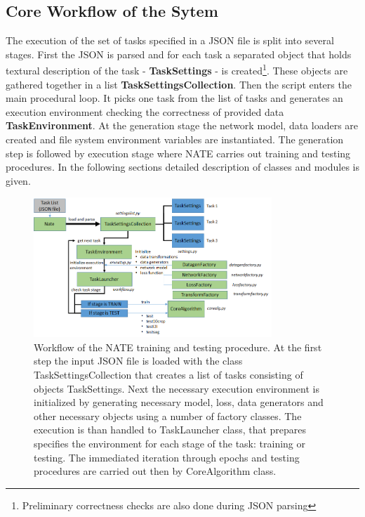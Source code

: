\documentclass[a4paper, 11pt]{article}
\begin{document}
\subsection{Core Workflow of the Sytem}
The execution of the set of tasks specified in a JSON file is split into several stages. First the JSON is parsed and for each task a separated object that holds textural description of the task - \textbf{TaskSettings} - is created\footnote{Preliminary correctness checks are also done during JSON parsing}. 
These objects are gathered together in a list \textbf{TaskSettingsCollection}. Then the script enters the main procedural loop. It picks one task from the list of tasks and generates an execution environment checking the correctness of provided data \textbf{TaskEnvironment}. At the generation stage the network model, data loaders are created and file system environment variables are instantiated. The generation step is followed by execution stage where NATE carries out training and testing procedures. In the following sections detailed description of classes and modules is given.
\begin{figure}
    \centering
    \includegraphics[width=0.8\textwidth]{img/schemenate1.png} 
    \caption{Workflow of the NATE training and testing procedure. At the first step the input JSON file is loaded with the class TaskSettingsCollection that creates a list of tasks consisting of objects TaskSettings. Next the necessary execution environment is initialized by generating necessary model, loss, data generators and other necessary objects using a number of factory classes. The execution is than handled to TaskLauncher class, that prepares specifies the environment for each stage of the task: training or testing. The immediated iteration through epochs and testing procedures are carried out then by CoreAlgorithm class.}
    \label{fig:my_label}
\end{figure}
\end{document}
